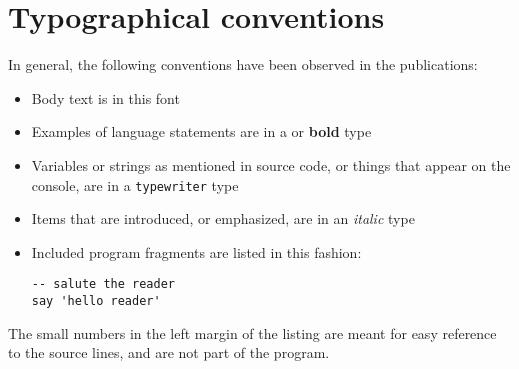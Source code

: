 \chapter{Typographical conventions}
In general, the following conventions have  been observed in the \crexx{} publications:
\begin{itemize}
\item Body text is in this font
\item Examples of language statements are in a  or \textbf{bold} type
\item Variables or strings as mentioned in source code, or things that appear on the console, are in a \texttt{typewriter} type
\item Items that are introduced, or emphasized, are in an \emph{italic} type
\item Included program fragments are listed in this fashion:
\begin{lstlisting}[label=example,caption=Example Listing]
-- salute the reader
say 'hello reader'
\end{lstlisting}
\end{itemize}
The small numbers in the left margin of the listing are meant for easy
reference to the source lines, and are not part of the program.

